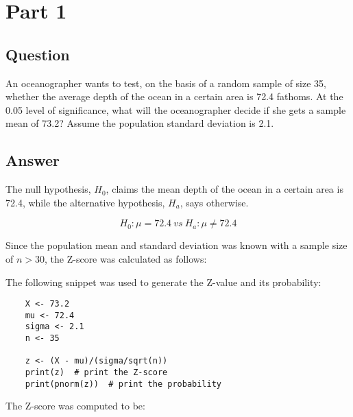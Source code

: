 \section{Part 1}
    \subsection{Question}
    An oceanographer wants to test, on the basis of a random sample of size 35, whether the average depth of the ocean in a certain area is 72.4 fathoms. At the 0.05 level of significance, what will the oceanographer decide if she gets a sample mean of 73.2? Assume the population standard deviation is 2.1.

    \subsection{Answer}
    The null hypothesis, $H_{0}$, claims the mean depth of the ocean in a certain area is 72.4, while the alternative hypothesis, $H_{a}$, says otherwise.

        \[ H_{0}: \mu = 72.4 \ vs \ H_{a}: \mu \neq 72.4 \]

    Since the population mean and standard deviation was known with a sample size of $n > 30$, the Z-score was calculated as follows:

        \newline

    The following snippet was used to generate the Z-value and its probability:
\begin{lstlisting}
    X <- 73.2
    mu <- 72.4
    sigma <- 2.1
    n <- 35

    z <- (X - mu)/(sigma/sqrt(n))
    print(z)  # print the Z-score
    print(pnorm(z))  # print the probability
\end{lstlisting}

    The Z-score was computed to be:

        
